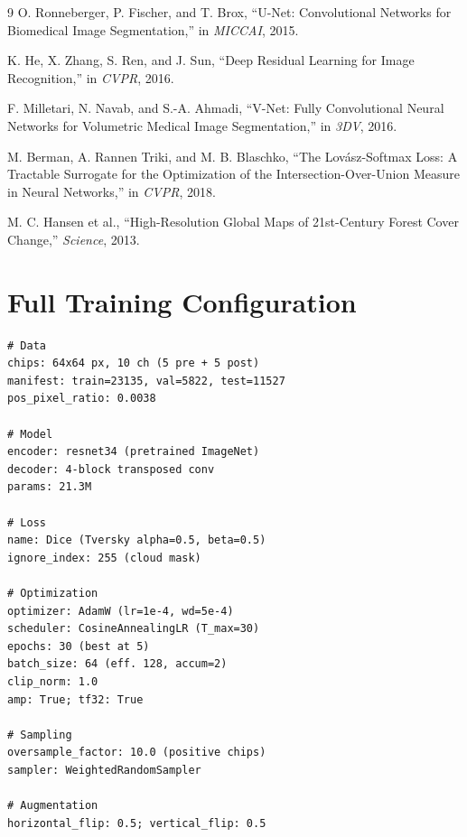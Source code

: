 \documentclass[twocolumn]{article}
\begin{document}
\begin{thebibliography}{9}
 O. Ronneberger, P. Fischer, and T. Brox, 
``U-Net: Convolutional Networks for Biomedical Image 
Segmentation,'' in \textit{MICCAI}, 2015.

 K. He, X. Zhang, S. Ren, and J. Sun, ``Deep 
Residual Learning for Image Recognition,'' in \textit{CVPR}, 2016.

 F. Milletari, N. Navab, and S.-A. Ahmadi, 
``V-Net: Fully Convolutional Neural Networks for Volumetric 
Medical Image Segmentation,'' in \textit{3DV}, 2016.

 M. Berman, A. Rannen Triki, and M. B. Blaschko, 
``The Lovász-Softmax Loss: A Tractable Surrogate for the 
Optimization of the Intersection-Over-Union Measure in Neural 
Networks,'' in \textit{CVPR}, 2018.

 M. C. Hansen et al., ``High-Resolution Global 
Maps of 21st-Century Forest Cover Change,'' \textit{Science}, 
2013.
\end{thebibliography}

\appendix

\section{Full Training Configuration}
\label{app:config}
\begin{verbatim}
# Data
chips: 64x64 px, 10 ch (5 pre + 5 post)
manifest: train=23135, val=5822, test=11527
pos_pixel_ratio: 0.0038

# Model
encoder: resnet34 (pretrained ImageNet)
decoder: 4-block transposed conv
params: 21.3M

# Loss
name: Dice (Tversky alpha=0.5, beta=0.5)
ignore_index: 255 (cloud mask)

# Optimization
optimizer: AdamW (lr=1e-4, wd=5e-4)
scheduler: CosineAnnealingLR (T_max=30)
epochs: 30 (best at 5)
batch_size: 64 (eff. 128, accum=2)
clip_norm: 1.0
amp: True; tf32: True

# Sampling
oversample_factor: 10.0 (positive chips)
sampler: WeightedRandomSampler

# Augmentation
horizontal_flip: 0.5; vertical_flip: 0.5
\end{verbatim}
\end{document}
